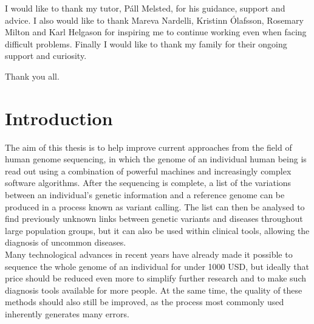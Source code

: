 \documentclass[a4paper,12pt,twoside,BCOR=10mm]{scrbook}
\begin{document}
%
%
%
%
%

I would like to thank my tutor, Páll Melsted, for his guidance, support and advice.
I also would like to thank Mareva Nardelli, Kristinn Ólafsson, Rosemary Milton and Karl Helgason
for inspiring me to continue working even when facing difficult problems.
Finally I would like to thank my family for their ongoing support and curiosity.

Thank you all.

\chapter{Introduction}
\setcounter{page}{1}


The aim of this thesis is to help improve current approaches from the field of human genome sequencing,
in which the genome of an individual human being is read out using a combination of
powerful machines and increasingly complex software algorithms.
After the sequencing is complete, a list of the variations between an individual's genetic information
and a reference genome can be produced in a process known as variant calling.
The list can then be analysed to find previously unknown links between genetic variants and
diseases throughout large population groups, but it can also be used within clinical tools, allowing the
diagnosis of uncommon diseases. \\
Many technological advances in recent years have already made it possible to sequence the whole genome
of an individual for under 1000 USD,
but ideally that price should be reduced even more to simplify further research and to make such diagnosis
tools available for more people. At the same time, the quality of these methods should also still be improved,
as the process most commonly used inherently generates many errors.
\end{document}
